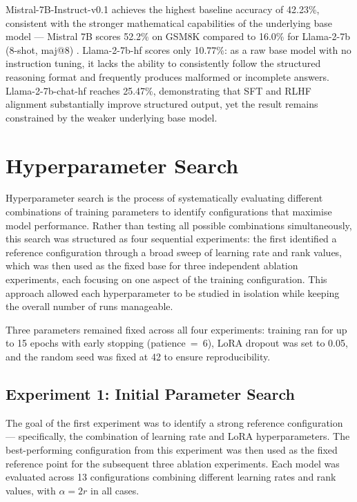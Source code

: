 Mistral-7B-Instruct-v0.1 achieves the highest baseline accuracy of
  42.23\%, consistent with the stronger mathematical capabilities of
  the underlying base model --- Mistral 7B  scores 52.2\% on GSM8K
  compared to 16.0\% for Llama-2-7b (8-shot, maj@8)
  \cite{jiang2023}. Llama-2-7b-hf scores only 10.77\%: as a
  raw base model with no instruction tuning, it lacks the ability to
  consistently follow the structured reasoning format and frequently
  produces malformed or incomplete answers. Llama-2-7b-chat-hf reaches
  25.47\%, demonstrating that SFT and RLHF alignment substantially
  improve structured output, yet the result remains constrained by
  the weaker underlying base model.

\section{Hyperparameter Search}
\label{sec:hyperparam-search}
Hyperparameter search is the process of systematically
  evaluating different combinations of training
  parameters to identify configurations that maximise
  model performance. Rather than testing all possible
  combinations simultaneously, this search was structured as four sequential experiments:
  the
  first identified a reference configuration through
  a broad sweep of learning rate and rank values,
  which was then used as the fixed base for three
  independent ablation experiments, each focusing on one aspect of the training
  configuration. This approach allowed
  each hyperparameter to be studied in isolation while
  keeping the overall number of runs manageable.

  Three parameters remained fixed across all four experiments:
  training ran for up to 15 epochs with early stopping (patience~=~6),
  LoRA dropout was set to 0.05, and the random seed was fixed at 42
  to ensure reproducibility.

  \subsection{Experiment 1: Initial Parameter Search}

  The goal of the first experiment was to identify a
  strong reference configuration --- specifically, the
  combination of learning rate and LoRA hyperparameters. The best-performing
  configuration from this experiment was then used as
  the fixed reference point for the subsequent three
  ablation experiments. Each model was evaluated across
  13 configurations combining different learning rates
  and rank values, with $\alpha = 2r$ in all cases.


